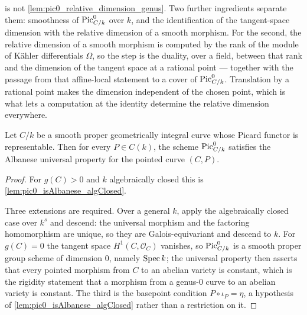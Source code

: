 \begin{remark}
  \label{rem:tangent_versus_relative_dimension}
   is not
  \cref{lem:pic0_relative_dimension_genus}. Two further ingredients separate them:
  smoothness of \(\operatorname{Pic}^0_{C/k}\) over \(k\), and the identification of the
  tangent-space dimension with the relative dimension of a smooth morphism. For the
  second, the relative dimension of a smooth morphism is computed by the rank of the
  module of Kähler differentials \(\Omega\), so the step is the duality, over a field,
  between that rank and the dimension of the tangent space at a rational point ---
  together with the passage from that affine-local statement to a cover of
  \(\operatorname{Pic}^0_{C/k}\). Translation by a rational point makes the dimension independent of
  the chosen point, which is what lets a computation at the identity determine the
  relative dimension everywhere.
\end{remark}

\begin{lemma}
  \label{lem:pic0_isAlbanese_all_points}
  Let \(C/k\) be a smooth proper geometrically integral curve whose Picard functor
  is representable. Then for every \(P\in C(k)\), the scheme \(\operatorname{Pic}^0_{C/k}\)
  satisfies the Albanese universal property for the pointed curve \((C,P)\).
\end{lemma}

\begin{proof}
  For \(g(C) > 0\) and \(k\) algebraically closed this is
  \cref{lem:pic0_isAlbanese_algClosed}.

  Three extensions are required. Over a general \(k\), apply the algebraically
  closed case over \(k^s\) and descend: the universal morphism and the factoring
  homomorphism are unique, so they are Galois-equivariant and descend to \(k\).
  For \(g(C) = 0\) the tangent space \(H^1(C,\mathcal O_C)\) vanishes, so
  \(\operatorname{Pic}^0_{C/k}\) is a smooth proper group scheme of dimension \(0\), namely
  \(\operatorname{Spec} k\); the universal property then asserts that every pointed morphism
  from \(C\) to an abelian variety is constant, which is the rigidity statement
  that a morphism from a genus-\(0\) curve to an abelian variety is constant.
  The third is the basepoint condition \(P \circ \iota_P = \eta\), a hypothesis
  of \cref{lem:pic0_isAlbanese_algClosed} rather than a restriction on it.
\end{proof}

